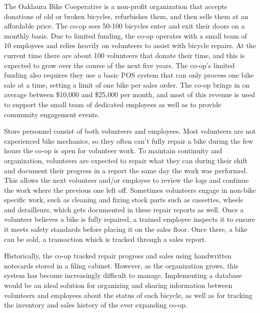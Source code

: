 \documentclass{article}
\begin{document}
\begin{tcolorbox}[colback=secondarycolor, colframe=primarycolor, arc=5mm]
\begingroup
\large
The Oaklaura Bike Cooperative is a non-profit organization that accepts donations of old or broken bicycles, refurbishes them, and then sells them at an affordable price. The co-op sees 50-100 bicycles enter and exit their doors on a monthly basis. Due to limited funding, the co-op operates with a small team of 10 employees and relies heavily on volunteers to assist with bicycle repairs. At the current time there are about 100 volunteers that donate their time, and this is expected to grow over the course of the next five years. The co-op’s limited funding also requires they use a basic POS system that can only process one bike sale at a time, setting a limit of one bike per sales order. The co-op brings in on average between \$10,000 and \$25,000 per month, and most of this revenue is used to support the small team of dedicated employees as well as to provide community engagement events. 

\vspace{0.2cm}

Store personnel consist of both volunteers and employees. Most volunteers are not experienced bike mechanics, so they often can't fully repair a bike during the few hours the co-op is open for volunteer work. To maintain continuity and organization, volunteers are expected to repair what they can during their shift and document their progress in a report the same day the work was performed. This allows the next volunteer and/or employee to review the logs and continue the work where the previous one left off. Sometimes volunteers engage in non-bike specific work, such as cleaning and fixing stock parts such as cassettes, wheels and derailleurs, which gets documented in these repair reports as well. Once a volunteer believes a bike is fully repaired, a trained employee inspects it to ensure it meets safety standards before placing it on the sales floor. Once there, a bike can be sold, a transaction which is tracked through a sales report. 

\vspace{0.2cm}

Historically, the co-op tracked repair progress and sales using handwritten notecards stored in a filing cabinet. However, as the organization grows, this system has become increasingly difficult to manage. Implementing a database would be an ideal solution for organizing and sharing information between volunteers and employees about the status of each bicycle, as well as for tracking the inventory and sales history of the ever expanding co-op.

\endgroup
\end{tcolorbox}
\end{document}

